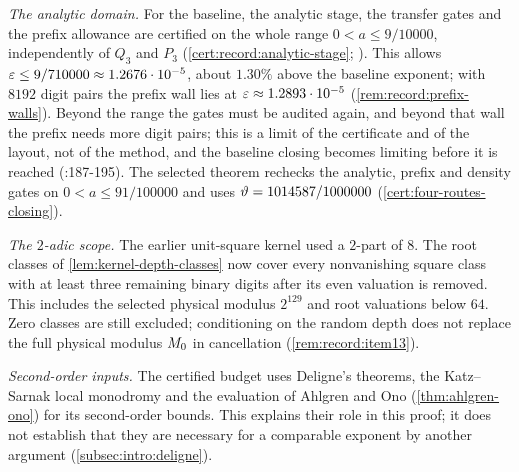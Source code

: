 \emph{The analytic domain.} For the baseline, the analytic stage, the transfer gates and the
prefix allowance are certified on the whole range $0<a\le9/10000$, independently
of $Q_3$ and $P_3$ (\cref{cert:record:analytic-stage};
). This allows
$\varepsilon\le9/710000\approx1.2676\cdot10^{-5}$, about $1.30\%$ above the baseline
exponent; with $8192$ digit pairs the prefix wall lies at
$\varepsilon\approx1.2893\cdot10^{-5}$ (\cref{rem:record:prefix-walls}). Beyond the range
the gates must be audited again, and beyond that wall the prefix needs more
digit pairs; this is a limit of the certificate and of the layout, not of the
method, and the baseline closing becomes limiting before it is reached
(:187-195). The selected theorem rechecks the analytic, prefix and density gates on $0<a\le91/100000$ and uses $\vartheta=1014587/1000000$ (\cref{cert:four-routes-closing}).

\emph{The $2$-adic scope.} The earlier unit-square kernel used a $2$-part
of $8$. The root classes of \cref{lem:kernel-depth-classes} now cover every
nonvanishing square class with at least three remaining binary digits after
its even valuation is removed. This includes the selected physical modulus
$2^{129}$ and root valuations below $64$. Zero classes are still excluded;
conditioning on the random depth does not replace the full physical modulus $M_0$ in cancellation (\cref{rem:record:item13}).

\emph{Second-order inputs.} The certified budget uses Deligne's theorems, the
Katz--Sarnak local monodromy and the evaluation of Ahlgren and Ono
(\cref{thm:ahlgren-ono}) for its second-order bounds. This explains their role in
this proof; it does not establish that they are necessary for a comparable
exponent by another argument (\cref{subsec:intro:deligne}).

